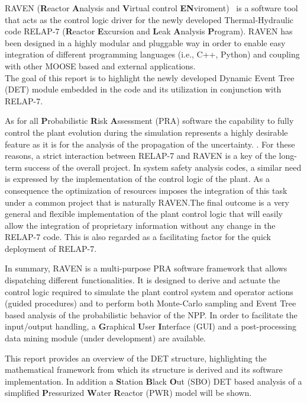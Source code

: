 \label{sec:introduction}
RAVEN (\textbf{R}eactor \textbf{A}nalysis and \textbf{V}irtual control \textbf{EN}viroment)~\cite{ravenFY12,mandelliANS2012} is a software tool that acts as the control logic driver for the newly developed Thermal-Hydraulic code RELAP-7  (\textbf{R}eactor \textbf{E}xcursion and \textbf{L}eak \textbf{A}nalysis \textbf{P}rogram).
RAVEN has been designed in a highly modular and pluggable way in order to enable easy integration of different programming languages (i.e., C++, Python) and coupling with other MOOSE based and external applications.
\\The goal of this report is to highlight the newly developed  Dynamic Event Tree (DET) module embedded in the code and its utilization in conjunction with RELAP-7.

As for all \textbf{P}robabilistic \textbf{R}isk \textbf{A}ssessment (PRA) software the capability to fully control the plant evolution during the simulation represents a highly desirable feature as it is for the analysis of the propagation of the uncertainty. . For these reasons, a strict interaction between RELAP-7 and RAVEN is a key of the long-term success of the overall project. In system safety analysis codes, a similar need is expressed by the implementation of the control logic of the plant. As a consequence the optimization of resources imposes the integration of this task under a common project that is naturally RAVEN.The final outcome is a very general and flexible implementation of the plant control logic that will easily allow the integration of proprietary information without any change in the RELAP-7 code. This is also regarded as a facilitating factor for the quick deployment of RELAP-7.

In summary, RAVEN is a multi-purpose PRA software framework that allows dispatching different functionalities.
It is designed to derive and actuate the control logic required to simulate the plant control system and operator actions (guided procedures) and to perform both Monte-Carlo sampling  and Event Tree based analysis of the probabilistic behavior of the NPP.
In order to facilitate the input/output handling, a \textbf{G}raphical \textbf{U}ser \textbf{I}nterface (GUI) and a post-processing data mining module (under development) are available.

This report provides an overview of the DET structure, highlighting the mathematical framework from which its structure is derived and its software implementation. In addition a \textbf{S}tation \textbf{B}lack \textbf{O}ut (SBO) DET based analysis of a simplified \textbf{P}ressurized \textbf{W}ater \textbf{R}eactor (PWR) model will be shown.
\vspace{-5mm}




